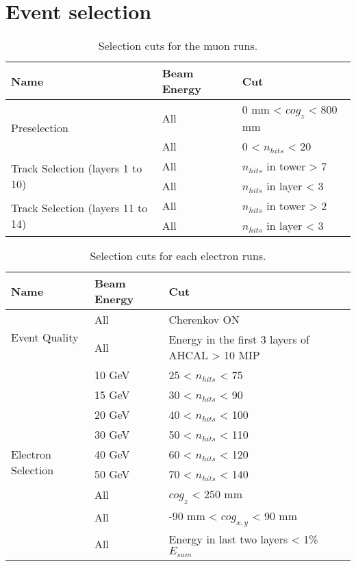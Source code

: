 \chapter{Event selection}
\label{appendix:evt_selection}

\begin{table}[htb!]
	\centering
	\caption{Selection cuts for the muon runs.}
	\label{table:muon_sel}
	\begin{tabular}{@{}lll@{}}
		\toprule
		\multicolumn{1}{l}{\textbf{Name}} & \textbf{Beam Energy} & \textbf{Cut}\\
		\midrule
		\multirow{2}{*}{Preselection}& All & 0 mm < $cog_{z}$ < 800 mm\\& All & 0 < $n_{hits}$ < 20 \\
		\midrule
		\multirow{2}{*}{Track Selection (layers 1 to 10)}& All & $n_{hits}$ in tower > 7 \\& All & $n_{hits}$ in layer < 3 \\
		\midrule
		\multirow{2}{*}{Track Selection (layers 11 to 14)}& All & $n_{hits}$ in tower > 2 \\& All & $n_{hits}$ in layer < 3 \\
		\bottomrule
	\end{tabular}
\end{table}

\begin{table}[htb!]
	\centering
	\caption{Selection cuts for each electron runs.}
	\label{table:electron_sel}
	\begin{tabular}{@{}lll@{}}
		\toprule
		\multicolumn{1}{l}{\textbf{Name}} & \textbf{Beam Energy} & \textbf{Cut}\\
		\midrule
		\multirow{2}{*}{Event Quality}& All & Cherenkov ON\\& All & Energy in the first 3 layers of AHCAL > 10 MIP \\
		\midrule
		\multirow{9}{*}{Electron Selection}& 10 GeV & 25 < $n_{hits}$ < 75 \\& 15 GeV & 30 < $n_{hits}$ < 90 \\& 20 GeV & 40 < $n_{hits}$ < 100 \\& 30 GeV & 50 < $n_{hits}$ < 110 \\& 40 GeV & 60 < $n_{hits}$ < 120 \\& 50 GeV & 70 < $n_{hits}$ < 140 \\& All & $cog_{z}$ < 250 mm\\& All & -90 mm < $cog_{x, y}$ < 90 mm \\& All & Energy in last two layers < 1\% $E_{sum}$ \\
		\bottomrule
	\end{tabular}
\end{table}

